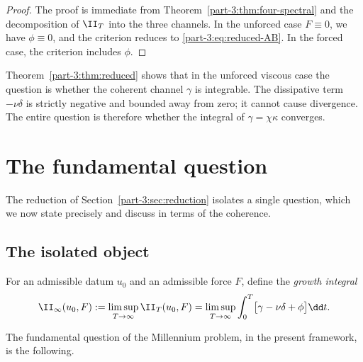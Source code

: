 \begin{proof}
The proof is immediate from Theorem~\ref{part-3:thm:four-spectral} and the 
decomposition of $\II_T$ into the three channels. In the unforced 
case $F\equiv 0$, we have $\phi\equiv 0$, and the criterion reduces 
to \eqref{part-3:eq:reduced-AB}. In the forced case, the criterion includes 
$\phi$.
\end{proof}

\begin{remark}\label{part-3:rem:viscosity-revisited}
Theorem~\ref{part-3:thm:reduced} shows that in the unforced viscous case 
the question is whether the coherent channel $\gamma$ is integrable. 
The dissipative term $-\nu\delta$ is strictly negative and bounded 
away from zero; it cannot cause divergence. The entire question is 
therefore whether the integral of $\gamma = \chi\kappa$ converges.
\end{remark}

\section{The fundamental question}
\label{part-3:sec:fundamental}

The reduction of Section~\ref{part-3:sec:reduction} isolates a single 
question, which we now state precisely and discuss in terms of the 
coherence.

\subsection{The isolated object}
\label{part-3:ssec:isolated}

\begin{definition}\label{part-3:def:growth-integral}
For an admissible datum $u_0$ and an admissible force $F$, define the 
\emph{growth integral}
\begin{equation}\label{part-3:eq:growth-integral}
\II_\infty(u_0,F) := \limsup_{T\to\infty}\II_T(u_0,F) 
= \limsup_{T\to\infty}\int_0^{T}\bigl[\gamma - \nu\delta + \phi\bigr]\dd t.
\end{equation}
\end{definition}

The fundamental question of the Millennium problem, in the present 
framework, is the following.


